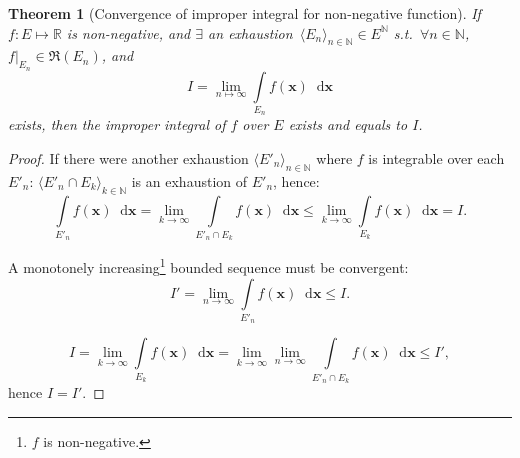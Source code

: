 \documentclass[openany]{book}
\theoremstyle{plain}
\newtheorem{theorem}{Theorem}[section] %
\theoremstyle{definition}
\newcommand{\dif}{\mathop{}\!\mathrm{d}} %
\newcommand*{\bv}{\boldsymbol} %
\begin{document}
\begin{theorem}[Convergence of improper integral for non-negative function]
	\label{theorem: convergence of improper integral for non-negative function}
	If $f \colon E \mapsto \mathbb R$ is non-negative, and $\exists$ an exhaustion~$\langle E_n \rangle_{n \in \mathbb N} \in E^\mathbb N$ s.t.\ $\forall n \in \mathbb N$, $f|_{E_n} \in \mathfrak R(E_n)$, and
	\begin{equation*}
		I = \lim_{n \mapsto \infty} \int\limits_{E_n} f(\bv x) \dif \bv x
	\end{equation*}
	exists, then the improper integral of $f$ over $E$ exists and equals to $I$. 
\end{theorem}
\begin{proof}
	If there were another exhaustion $\langle E'_n \rangle_{n \in \mathbb N}$ where $f$ is integrable over each $E'_n$: $\langle E'_n \cap E_k \rangle_{k \in \mathbb N}$ is an exhaustion of $E'_n$, hence:
	\begin{equation*}
		\int\limits_{E'_n} f(\bv x) \dif \bv x
		 = \lim_{k \to \infty} \int\limits_{E'_n \cap E_k} f(\bv x) \dif \bv x 
		\leq  \lim_{k \to \infty} \int\limits_{E_k} f(\bv x) \dif \bv x = I.
	\end{equation*}

	A monotonely increasing\footnote{$f$ is non-negative.} bounded sequence must be convergent:
	\begin{equation*}
		I' = \lim_{n \to \infty} \int\limits_{E'_n} f(\bv x) \dif \bv x \leq I.
	\end{equation*}

	\begin{equation*}
		I = \lim_{k \to \infty} \int\limits_{E_k} f(\bv x) \dif \bv x =
		\lim_{k \to \infty} \lim_{n \to \infty} \int\limits_{E'_n \cap E_k} f(\bv x) \dif \bv x 
		\leq I',
	\end{equation*}
	hence $I = I'$.
\end{proof}
\end{document}
